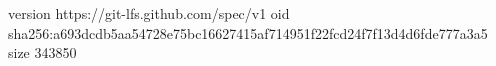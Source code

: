 version https://git-lfs.github.com/spec/v1
oid sha256:a693dcdb5aa54728e75bc16627415af714951f22fcd24f7f13d4d6fde777a3a5
size 343850
